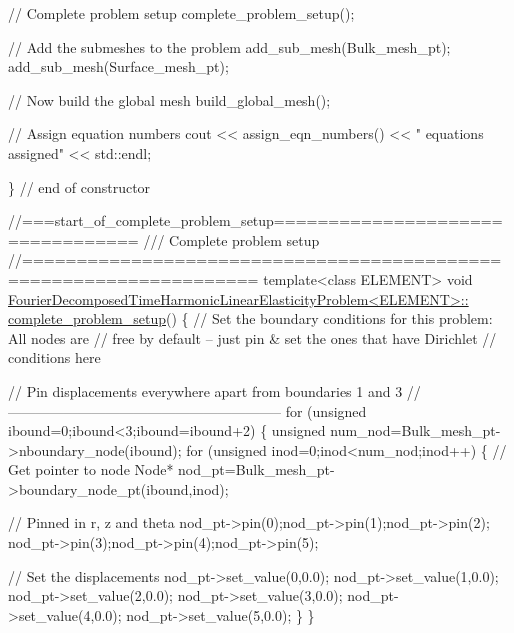 \begin{DoxyCodeInclude}
 \textcolor{comment}{// Complete problem setup}
 complete\_problem\_setup();

 \textcolor{comment}{// Add the submeshes to the problem}
 add\_sub\_mesh(Bulk\_mesh\_pt);
 add\_sub\_mesh(Surface\_mesh\_pt);

 \textcolor{comment}{// Now build the global mesh}
 build\_global\_mesh();

 \textcolor{comment}{// Assign equation numbers}
 cout << assign\_eqn\_numbers() << \textcolor{stringliteral}{" equations assigned"} << std::endl; 

\} \textcolor{comment}{// end of constructor}



\textcolor{comment}{//===start\_of\_complete\_problem\_setup=================================}\textcolor{comment}{}
\textcolor{comment}{/// Complete problem setup}
\textcolor{comment}{}\textcolor{comment}{//===================================================================}
\textcolor{keyword}{template}<\textcolor{keyword}{class} ELEMENT>
\textcolor{keywordtype}{void} \hyperlink{classFourierDecomposedTimeHarmonicLinearElasticityProblem_aeb3e1638026cb1cabf1b16a32496f63c}{FourierDecomposedTimeHarmonicLinearElasticityProblem<ELEMENT>::}
\hyperlink{classFourierDecomposedTimeHarmonicLinearElasticityProblem_aeb3e1638026cb1cabf1b16a32496f63c}{complete\_problem\_setup}()
\{
 \textcolor{comment}{// Set the boundary conditions for this problem: All nodes are}
 \textcolor{comment}{// free by default -- just pin & set the ones that have Dirichlet }
 \textcolor{comment}{// conditions here}

 \textcolor{comment}{// Pin displacements everywhere apart from boundaries 1 and 3}
 \textcolor{comment}{//-----------------------------------------------------------}
 \textcolor{keywordflow}{for} (\textcolor{keywordtype}{unsigned} ibound=0;ibound<3;ibound=ibound+2)
  \{
   \textcolor{keywordtype}{unsigned} num\_nod=Bulk\_mesh\_pt->nboundary\_node(ibound);
   \textcolor{keywordflow}{for} (\textcolor{keywordtype}{unsigned} inod=0;inod<num\_nod;inod++) 
    \{
     \textcolor{comment}{// Get pointer to node}
     Node* nod\_pt=Bulk\_mesh\_pt->boundary\_node\_pt(ibound,inod);
     
     \textcolor{comment}{// Pinned in r, z and theta}
     nod\_pt->pin(0);nod\_pt->pin(1);nod\_pt->pin(2);
     nod\_pt->pin(3);nod\_pt->pin(4);nod\_pt->pin(5);
     
     \textcolor{comment}{// Set the displacements}
     nod\_pt->set\_value(0,0.0);
     nod\_pt->set\_value(1,0.0);
     nod\_pt->set\_value(2,0.0);
     nod\_pt->set\_value(3,0.0);
     nod\_pt->set\_value(4,0.0);
     nod\_pt->set\_value(5,0.0);
    \}
  \}



\end{DoxyCodeInclude}
